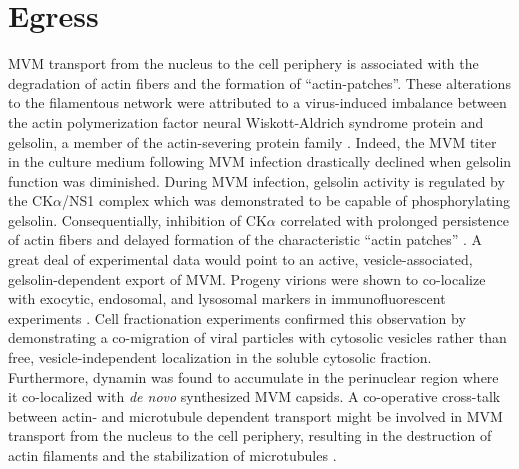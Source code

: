 \section{Egress}
\label{Egress}
MVM transport from the nucleus to the cell periphery is associated with the degradation of actin fibers and the formation of “actin-patches”. These alterations to the filamentous network were attributed to a virus-induced imbalance between the actin polymerization factor neural Wiskott-Aldrich syndrome protein and gelsolin, a member of the actin-severing protein family \cite{pmid15582663}. Indeed, the MVM titer in the culture medium following MVM infection drastically declined when gelsolin function was diminished. During MVM infection, gelsolin activity is regulated by the CK$\alpha$/NS1 complex which was demonstrated to be capable of phosphorylating gelsolin. Consequentially, inhibition of CK$\alpha$ correlated with prolonged persistence of actin fibers and delayed formation of the characteristic “actin patches” \cite{pmid18704167, pmid16641266}. A great deal of experimental data would point to an active, vesicle-associated, gelsolin-dependent export of MVM. Progeny virions were shown to co-localize with exocytic, endosomal, and lysosomal markers in immunofluorescent experiments \cite{pmid18704167, pmid17287256}. Cell fractionation experiments confirmed this observation by demonstrating a co-migration of viral particles with cytosolic vesicles rather than free, vesicle-independent localization in the soluble cytosolic fraction. Furthermore, dynamin was found to accumulate in the perinuclear region where it co-localized with \textit{de novo} synthesized MVM capsids. A co-operative cross-talk between actin- and microtubule dependent transport \cite{pmid15040446, pmid12383793, pmid17998399} might be involved in MVM transport from the nucleus to the cell periphery, resulting in the destruction of actin filaments and the stabilization of microtubules \cite{pmid18704167}.  

